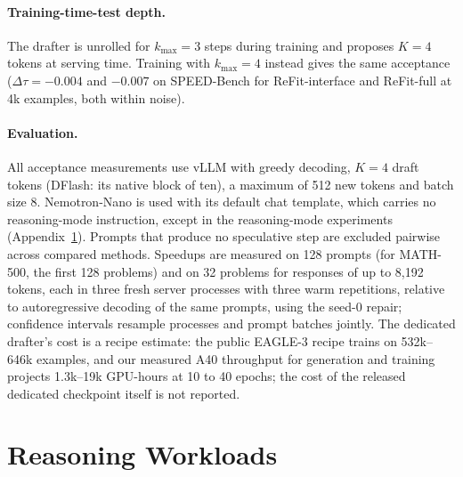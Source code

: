 \documentclass[11pt]{article}
\newcommand{\refitI}{ReFit-interface}
\newcommand{\refitF}{ReFit-full}
\begin{document}
\paragraph{Training-time-test depth.}
The drafter is unrolled for $k_{\max}{=}3$ steps during training and proposes $K{=}4$ tokens at serving time.
Training with $k_{\max}{=}4$ instead gives the same acceptance ($\Delta\tau = -0.004$ and $-0.007$ on SPEED-Bench for \refitI{} and \refitF{} at 4k examples, both within noise).

\paragraph{Evaluation.}
All acceptance measurements use vLLM with greedy decoding, $K{=}4$ draft tokens (DFlash: its native block of ten), a maximum of 512 new tokens and batch size 8.
Nemotron-Nano is used with its default chat template, which carries no reasoning-mode instruction, except in the reasoning-mode experiments (Appendix~\ref{app:long}).
Prompts that produce no speculative step are excluded pairwise across compared methods.
Speedups are measured on 128 prompts (for MATH-500, the first 128 problems) and on 32 problems for responses of up to 8,192 tokens, each in three fresh server processes with three warm repetitions, relative to autoregressive decoding of the same prompts, using the seed-0 repair; confidence intervals resample processes and prompt batches jointly.
The dedicated drafter's cost is a recipe estimate: the public EAGLE-3 recipe trains on 532k--646k examples, and our measured A40 throughput for generation and training projects 1.3k--19k GPU-hours at 10 to 40 epochs; the cost of the released dedicated checkpoint itself is not reported.

\section{Reasoning Workloads}
\label{app:long}
\end{document}
